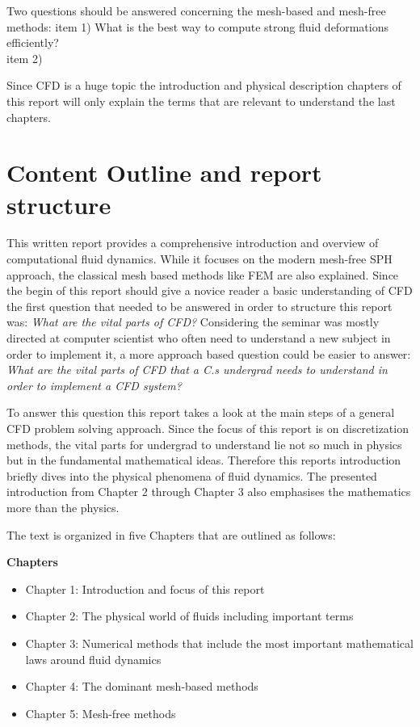 Two questions should be answered concerning the mesh-based and mesh-free methods:
item 1) What is the best way to compute strong fluid deformations efficiently? \\
item 2) 

Since CFD is a huge topic the introduction and physical description chapters of this report will only explain the terms that are relevant to understand the last chapters.

\section{Content Outline and report structure}

This written report provides a comprehensive introduction and overview of computational fluid dynamics. While it focuses on the modern mesh-free SPH approach, the classical mesh based methods like FEM are also explained. Since the begin of this report should give a novice reader a basic understanding of CFD the first question that needed to be answered in order to structure this report was: \emph{What are the vital parts of CFD?} 
Considering the seminar was mostly directed at computer scientist who often need to understand a new subject in order to implement it, a more approach based question
could be easier to answer: \emph{What are the vital parts of CFD that a C.s undergrad needs to understand in order to implement a CFD system?}

To answer this question this report takes a look at the main steps of a general CFD problem solving approach. Since the focus of this report is on discretization methods, the vital parts for undergrad to understand lie not so much in physics but in the fundamental mathematical ideas. Therefore this reports introduction briefly dives into the physical phenomena of fluid dynamics. The presented introduction from Chapter 2 through Chapter 3 also emphasises the mathematics more than the physics.
 
The text is organized in five Chapters that are outlined as follows:

\textbf{Chapters} 
\begin{itemize}

\item Chapter 1: Introduction and focus of this report
\item Chapter 2: The physical world of fluids including important terms 
\item Chapter 3: Numerical methods that include the most important mathematical
laws around fluid dynamics
\item Chapter 4: The dominant mesh-based methods
\item Chapter 5: Mesh-free methods

\end{itemize}


